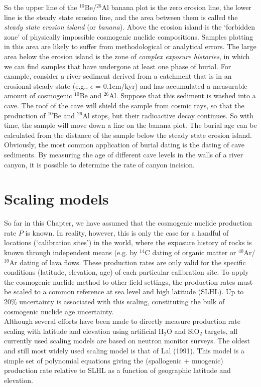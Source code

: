 So the upper line of the $^{10}$Be/$^{26}$Al banana plot is the zero
erosion line, the lower line is the steady state erosion line, and the
area between them is called the \emph{steady state erosion island} (or
\emph{banana}).  Above the erosion island is the `forbidden zone' of
physically impossible cosmogenic nuclide compositions. Samples
plotting in this area are likely to suffer from methodological or
analytical errors. The large area below the erosion island is the zone
of \emph{complex exposure histories}, in which we can find samples
that have undergone at least one phase of burial. For example,
consider a river sediment derived from a catchment that is in an
erosional steady state (e.g., $\epsilon$ = 0.1cm/kyr) and has
accumulated a measurable amount of cosmogenic $^{10}$Be and
$^{26}$Al. Suppose that this sediment is washed into a cave.  The roof
of the cave will shield the sample from cosmic rays, so that the
production of $^{10}$Be and $^{26}$Al stops, but their radioactive
decay continues. So with time, the sample will move down a line on the
banana plot. The burial age can be calculated from the distance of the
sample below the steady state erosion island.  Obviously, the most
common application of burial dating is the dating of cave
sediments. By measuring the age of different cave levels in the walls
of a river canyon, it is possible to determine the rate of canyon
incision.

\section{Scaling models}
\label{sec:scaling}

So far in this Chapter, we have assumed that the cosmogenic nuclide
production rate $P$ is known. In reality, however, this is only the
case for a handful of locations (`calibration sites') in the world,
where the exposure history of rocks is known through independent means
(e.g. by $^{14}$C dating of organic matter or $^{40}$Ar/$^{39}$Ar
dating of lava flows. These production rates are only valid for the
specific conditions (latitude, elevation, age) of each particular
calibration site. To apply the cosmogenic nuclide method to other
field settings, the production rates must be scaled to a common
reference at sea level and high latitude (SLHL). Up to 20\%
uncertainty is associated with this scaling, constituting the bulk of
cosmogenic nuclide age uncertainty.\\

Although several efforts have been made to directly measure production
rate scaling with latitude and elevation using artificial H$_{2}$O and
SiO$_2$ targets, all currently used scaling models are based on
neutron monitor surveys. The oldest and still most widely used scaling
model is that of Lal (1991). This model is a simple set of polynomial
equations giving the (spallogenic + muogenic) production rate relative
to SLHL as a function of geographic latitude and elevation.\\

